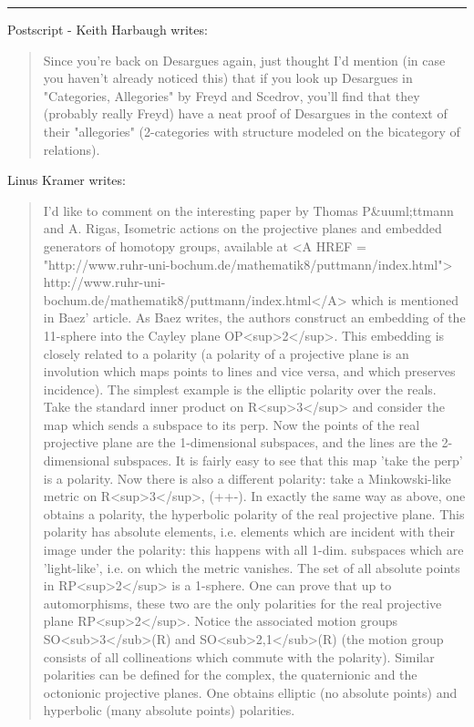 \par\noindent\rule{\textwidth}{0.4pt}
Postscript - Keith Harbaugh writes:
\begin{quote}
Since you're back on Desargues again, just thought I'd mention
(in case you haven't already noticed this)
that if you look up Desargues in "Categories, Allegories"
by Freyd and Scedrov,
you'll find that they (probably really Freyd)
have a neat proof of Desargues in the context of their "allegories"
(2-categories with structure modeled on the bicategory of relations).
\end{quote}
    

Linus Kramer writes:
\begin{quote}
I'd like to comment on the interesting paper by Thomas P&uuml;ttmann and
A. Rigas, Isometric actions on the projective planes and embedded
generators of homotopy groups, available at
<A HREF =
"http://www.ruhr-uni-bochum.de/mathematik8/puttmann/index.html">
http://www.ruhr-uni-bochum.de/mathematik8/puttmann/index.html</A>
which is mentioned in Baez' article.
As Baez writes, the authors construct an embedding of the 11-sphere
into the Cayley plane OP<sup>2</sup>. This embedding is closely related to
a polarity (a polarity of a projective plane is an involution which
maps points to lines and vice versa, and which preserves incidence).
The simplest example is the elliptic polarity over the reals.
Take the standard inner product on R<sup>3</sup> and consider the map
which sends a subspace to its perp. Now the points of the real
projective plane are the 1-dimensional subspaces, and the lines are
the 2-dimensional subspaces. It is fairly easy to see that this
map 'take the perp' is a polarity.
Now there is also a different polarity: take a Minkowski-like
metric on R<sup>3</sup>, (++-). In exactly the same way as above, one
obtains a polarity, the hyperbolic polarity of the real projective
plane. This polarity has absolute elements, i.e. elements which
are incident with their image under the polarity: this happens
with all 1-dim. subspaces which are 'light-like', i.e. on which
the metric vanishes. The set of all absolute points in RP<sup>2</sup> is
a 1-sphere. 
One can prove that up to automorphisms, these two are the only
polarities for the real projective plane RP<sup>2</sup>. Notice the
associated motion groups SO<sub>3</sub>(R) and SO<sub>2,1</sub>(R) (the motion group
consists of all collineations which commute with the polarity).
Similar polarities can be defined for the complex, the quaternionic
and the octonionic projective planes. One obtains elliptic
(no absolute points) and hyperbolic (many absolute points) polarities.

\end{quote}
